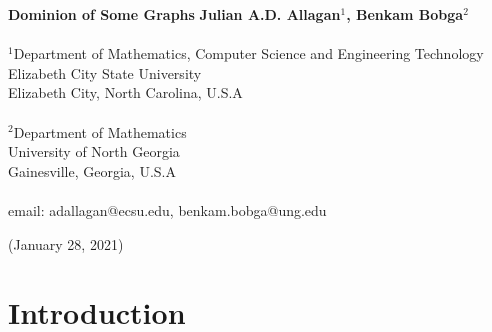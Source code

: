\documentclass[twoside,12pt]{article}
\begin{document}
\textheight=570pt 
\begin{center} {\Large\bf  Dominion of Some Graphs}
\vskip 1cm {\bf  Julian A.D. Allagan$^{1}$, Benkam Bobga$^{2}$  }\\
\
\\$^{1}$Department of Mathematics, Computer Science and Engineering Technology\\
Elizabeth City State University \\
	Elizabeth City, North Carolina, U.S.A 
\\%
\
\\$^{2}$Department of Mathematics\\
University of North Georgia\\
Gainesville, Georgia, U.S.A
\\%
\
\\email: adallagan@ecsu.edu, benkam.bobga@ung.edu \\
\end{center}
\begin{center}
(January 28, 2021)
\end{center}
\begin{abstract}
			Given a graph $G = (V,E)$, a subset $S \subseteq V$ is a dominating set if every vertex in $V\setminus S$ is adjacent to some vertex in $S$. The dominating set with the least cardinality, $\gamma$, is called a $\gamma$-set which is commonly known as a minimum dominating set. The dominion of a graph $G$, denoted by $\zeta(G)$, is the number of its $\gamma$-sets. Some relations between these two seemingly distinct parameters are established. In particular, we present the dominions of paths, some cycles and the join of any two graphs.   
\end{abstract}
\begingroup
\newtheorem{conjecture}{Conjecture}[section]
\newtheorem{theorem}{Theorem}[section]
\newtheorem{lemma}[theorem]{Lemma}
\newtheorem{proposition}[theorem]{Proposition}
\newtheorem{corollary}[theorem]{Corollary}
\newtheorem{definition}[theorem]{Definition}
\newtheorem{remark}[theorem]{Remark}
\newtheorem{example}[theorem]{Example}
\newtheorem{claim}[theorem]{Claim}
\endgroup
\def\E#1{\left\langle #1 \right\rangle}
\def\diag{\mathop{\fam 0\relax diag}\nolimits}
\newcommand{\ds}{\displaystyle}
\section{Introduction}
\end{document}
